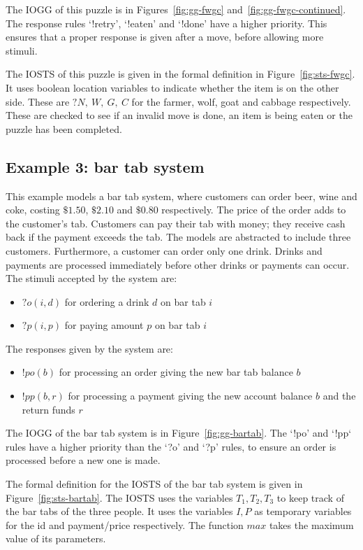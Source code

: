 The IOGG of this puzzle is in Figures~\ref{fig:gg-fwgc} and~\ref{fig:gg-fwgc-continued}. The response rules `!retry', `!eaten' and `!done' have a higher priority. This ensures that a proper response is given after a move, before allowing more stimuli.

The IOSTS of this puzzle is given in the formal definition in Figure~\ref{fig:sts-fwgc}. It uses boolean location variables to indicate whether the item is on the other side. These are $?N,\:W,\:G,\:C$ for the farmer, wolf, goat and cabbage respectively. These are checked to see if an invalid move is done, an item is being eaten or the puzzle has been completed.

\subsection{Example 3: bar tab system}\label{sec:bar-tab}
This example models a bar tab system, where customers can order beer, wine and coke, costing $\$1.50$, $\$2.10$ and $\$0.80$ respectively. The price of the order adds to the customer's tab. Customers can pay their tab with money; they receive cash back if the payment exceeds the tab. The models are abstracted to include three customers. Furthermore, a customer can order only one drink. Drinks and payments are processed immediately before other drinks or payments can occur. The stimuli accepted by the system are:
\begin{itemize}
\item $?o(i,d)$ for ordering a drink $d$ on bar tab $i$
\item $?p(i,p)$ for paying amount $p$ on bar tab $i$
\end{itemize}
The responses given by the system are:
\begin{itemize}
\item $!po(b)$ for processing an order giving the new bar tab balance $b$
\item $!pp(b,r)$ for processing a payment giving the new account balance $b$ and the return funds $r$
\end{itemize}

The IOGG of the bar tab system is in Figure~\ref{fig:gg-bartab}. The `!po' and `!pp` rules have a higher priority than the `?o' and `?p' rules, to ensure an order is processed before a new one is made.

The formal definition for the IOSTS of the bar tab system is given in Figure~\ref{fig:sts-bartab}. The IOSTS uses the variables $T_1, T_2, T_3$ to keep track of the bar tabs of the three people. It uses the variables $I, P$ as temporary variables for the id and payment/price respectively. The function $max$ takes the maximum value of its parameters.

